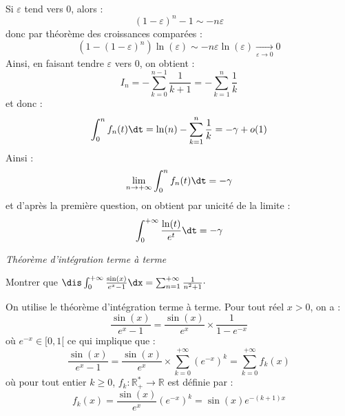 \documentclass[a4paper,10pt]{report}
\begin{document}
\begin{enumerate}
\begin{align*}
 \end{align*}
 Si $\varepsilon$ tend vers $0$, alors :
 $$ (1- \varepsilon)^n -1 \sim -n \varepsilon$$
 donc par théorème des croissances comparées :
 $$ (1-(1- \varepsilon)^n)\ln(\varepsilon) \sim - n \varepsilon \ln(\varepsilon) \underset{\varepsilon \rightarrow 0}{\longrightarrow} 0$$
 Ainsi, en faisant tendre $\varepsilon$ vers $0$, on obtient :
 $$ I_n = - \sum_{k=0}^{n-1} \dfrac{1}{k+1} = - \sum_{k=1}^n \dfrac{1}{k}$$
 et donc :
 $$ \int_{0}^n f_n(t) \dt = \ln(n)  - \sum_{k=1}^n \dfrac{1}{k} = -\gamma + o(1)$$
 Ainsi :
 $$ \lim_{n \rightarrow + \infty} \int_{0}^n f_n(t) \dt = - \gamma$$
 et d'après la première question, on obtient par unicité de la limite : 
 $$  \int_{0}^{+ \infty} \dfrac{\ln(t)}{e^t} \dt = - \gamma $$
\end{enumerate}

\medskip

\begin{center}
\textit{{ {\large Théorème d'intégration terme à terme}}}
\end{center}

\medskip

\begin{Exa} Montrer que $\dis \int_{0}^{+ \infty} \frac{\sin(x)}{e^x-1} \dx = \sum_{n=1}^{+ \infty} \frac{1}{n^2+1}\cdot$
\end{Exa}

\corr On utilise le théorème d'intégration terme à terme. Pour tout réel $x>0$, on a :
$$ \frac{\sin(x)}{e^x-1}  = \dfrac{\sin(x)}{e^x} \times \dfrac{1}{1-e^{-x}}$$
où $e^{-x} \in [0,1[$ ce qui implique que :
$$ \frac{\sin(x)}{e^x-1}  = \dfrac{\sin(x)}{e^x} \times \sum_{k=0}^{+ \infty} (e^{-x})^k  = \sum_{k=0}^{+ \infty} f_k(x)$$
où pour tout entier $k \geq 0$, $f_k : \mathbb{R}_+^* \rightarrow \mathbb{R}$ est définie par :
$$ f_k(x) = \dfrac{\sin(x)}{e^x} (e^{-x})^k = \sin(x) e^{-(k+1)x}$$
\end{document}
